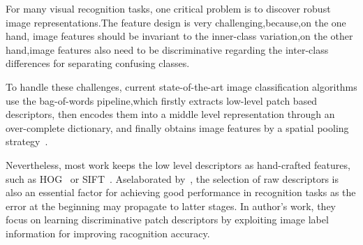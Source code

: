 \documentclass[10pt,twocolumn,letterpaper]{article}
\begin{document}
For many visual recognition tasks, one critical problem is to discover robust image representations.The feature design is very challenging,because,on the one hand, image features should be invariant to the inner-class variation,on the other hand,image features also need to be discriminative regarding the inter-class differences for separating confusing classes.
\par To handle these challenges, current state-of-the-art
image classification algorithms use the bag-of-words pipeline,which firstly extracts low-level patch based descriptors, then encodes them into a middle level representation through an over-complete dictionary, and finally obtains image features by a spatial pooling strategy~\cite{LBo2009kernel,jfeng2009Geometric,Gao2010features,
Lazebnik2006features,Yang2009LInear}.
\par Nevertheless, most work keeps the low level descriptors as hand-crafted features, such as HOG~\cite{Dalal2004Histograms} or SIFT~\cite{Gao2010features}.
Aselaborated by~\cite{Mikolajczyk2005evaluation,Tamrakar2012Evaluation}, the selection of raw descriptors is
also an essential factor for achieving good performance in
recognition tasks as the error at the beginning may propagate to latter stages. 
In author's work, they focus on learning
discriminative patch descriptors by exploiting image label
information for improving racognition accuracy.


{\small

}
\end{document}
